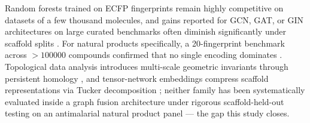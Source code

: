 Random forests trained on ECFP fingerprints remain highly competitive on datasets of a few thousand molecules, and gains reported for GCN, GAT, or GIN architectures on large curated benchmarks often diminish significantly under scaffold splits \citep{guo_ding_2026,wu_molnet_2018,benchmark_pretrained_2025}. For natural products specifically, a \num{20}-fingerprint benchmark across $>\num{100000}$ compounds confirmed that no single encoding dominates \citep{boldini2024}. Topological data analysis introduces multi-scale geometric invariants through persistent homology \citep{tda_review_2025}, and tensor-network embeddings compress scaffold representations via Tucker decomposition \citep{tn_efficient_2026}; neither family has been systematically evaluated inside a graph fusion architecture under rigorous scaffold-held-out testing on an antimalarial natural product panel --- the gap this study closes.
